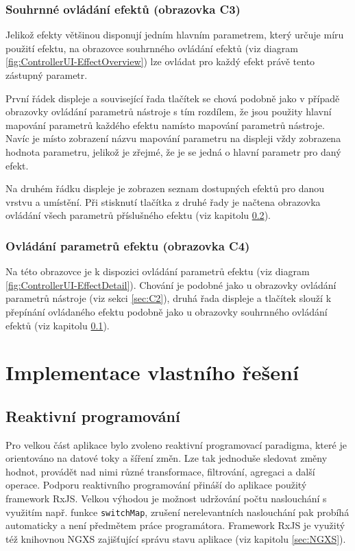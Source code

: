 \documentclass[thesis=M,czech]{FITthesis}[2019/03/06]
\begin{document}
		\subsection{Souhrnné ovládání efektů (obrazovka C3)}\label{sec:C3}
			Jelikož efekty většinou disponují jedním hlavním parametrem, který určuje míru použití efektu,
			na obrazovce souhrnného ovládání efektů (viz diagram \ref{fig:ControllerUI-EffectOverview}) lze ovládat pro každý
			efekt právě tento zástupný parametr.
			
			První řádek displeje a související řada tlačítek se chová podobně jako v případě obrazovky ovládání parametrů nástroje
			s tím rozdílem, že jsou použity hlavní mapování parametrů každého efektu namísto mapování parametrů nástroje.
			Navíc je místo zobrazení názvu mapování parametru na displeji vždy zobrazena hodnota parametru, jelikož je zřejmé,
			že je se jedná o hlavní parametr pro daný efekt.
			
			Na druhém řádku displeje je zobrazen seznam dostupných efektů pro danou vrstvu a umístění. Při stisknutí tlačítka
			z druhé řady je načtena obrazovka ovládání všech parametrů příslušného efektu (viz kapitolu \ref{sec:C4}).
		
		\subsection{Ovládání parametrů efektu (obrazovka C4)}\label{sec:C4}
			Na této obrazovce je k dispozici ovládání parametrů efektu (viz diagram \ref{fig:ControllerUI-EffectDetail}).
			Chování je podobné jako u obrazovky ovládání parametrů nástroje (viz sekci \ref{sec:C2}), druhá řada displeje a tlačítek
			slouží k přepínání ovládaného efektu podobně jako u obrazovky souhrnného ovládání efektů (viz kapitolu \ref{sec:C3}).
		
\chapter{Implementace vlastního řešení}
	\section{Reaktivní programování}
		Pro velkou část aplikace bylo zvoleno reaktivní programovací paradigma, které je orientováno
		na datové toky a šíření změn. Lze tak jednoduše sledovat změny hodnot, provádět 
		nad nimi různé transformace, filtrování, agregaci a další operace. Podporu reaktivního programování přináší do aplikace
		použitý framework RxJS\cite{clow2018observers}. Velkou výhodou je možnost udržování počtu naslouchání
		s využitím např. funkce \texttt{switchMap}, zrušení nerelevantních naslouchání pak probíhá automaticky a není předmětem práce programátora.
		Framework RxJS je využitý též knihovnou NGXS zajišťující správu stavu aplikace (viz kapitolu \ref{sec:NGXS}).
\end{document}
